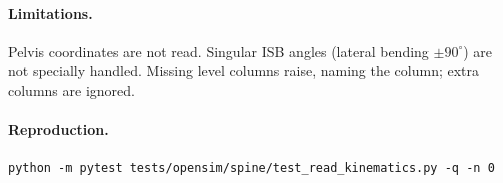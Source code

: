 \paragraph{Limitations.}
Pelvis coordinates are not read. Singular ISB angles (lateral bending
$\pm90^\circ$) are not specially handled. Missing level columns raise, naming the
column; extra columns are ignored.

\paragraph{Reproduction.}
\begin{verbatim}
python -m pytest tests/opensim/spine/test_read_kinematics.py -q -n 0
\end{verbatim}
